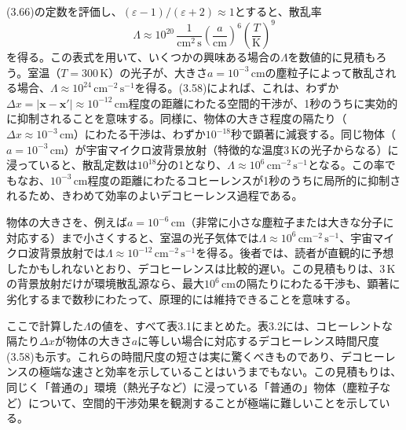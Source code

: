 (3.66)の定数を評価し、$(\varepsilon-1)/(\varepsilon+2)\approx1$とすると、散乱率
\begin{equation}
\Lambda\approx10^{20}\,\frac{1}{\mathrm{cm}^2\,\mathrm s}\left(\frac a{\mathrm{cm}}\right)^6\left(\frac T{\mathrm K}\right)^9
\tag{3.67}
\end{equation}
を得る。この表式を用いて、いくつかの興味ある場合の$\Lambda$を数値的に見積もろう。室温（$T=300\,\mathrm K$）の光子が、大きさ$a=10^{-3}\,\mathrm{cm}$の塵粒子によって散乱される場合、$\Lambda\approx10^{24}\,\mathrm{cm}^{-2}\,\mathrm s^{-1}$を得る。(3.58)によれば、これは、わずか$\Delta x=|\bm x-\bm x'|\approx10^{-12}\,\mathrm{cm}$程度の距離にわたる空間的干渉が、1秒のうちに実効的に抑制されることを意味する。同様に、物体の大きさ程度の隔たり（$\Delta x\approx10^{-3}\,\mathrm{cm}$）にわたる干渉は、わずか$10^{-18}$秒で顕著に減衰する。同じ物体（$a=10^{-3}\,\mathrm{cm}$）が宇宙マイクロ波背景放射（特徴的な温度3\,Kの光子からなる）に浸っていると、散乱定数は$10^{18}$分の1となり、$\Lambda\approx10^6\,\mathrm{cm}^{-2}\,\mathrm s^{-1}$となる。この率でもなお、$10^{-3}\,\mathrm{cm}$程度の距離にわたるコヒーレンスが1秒のうちに局所的に抑制されるため、きわめて効率のよいデコヒーレンス過程である。

物体の大きさを、例えば$a=10^{-6}\,\mathrm{cm}$（非常に小さな塵粒子または大きな分子に対応する）まで小さくすると、室温の光子気体では$\Lambda\approx10^6\,\mathrm{cm}^{-2}\,\mathrm s^{-1}$、宇宙マイクロ波背景放射では$\Lambda\approx10^{-12}\,\mathrm{cm}^{-2}\,\mathrm s^{-1}$を得る。後者では、読者が直観的に予想したかもしれないとおり、デコヒーレンスは比較的遅い。この見積もりは、3\,Kの背景放射だけが環境散乱源なら、最大$10^6\,\mathrm{cm}$の隔たりにわたる干渉も、顕著に劣化するまで数秒にわたって、原理的には維持できることを意味する。

ここで計算した$\Lambda$の値を、すべて表3.1にまとめた。表3.2には、コヒーレントな隔たり$\Delta x$が物体の大きさ$a$に等しい場合に対応するデコヒーレンス時間尺度(3.58)も示す。これらの時間尺度の短さは実に驚くべきものであり、デコヒーレンスの極端な速さと効率を示していることはいうまでもない。この見積もりは、同じく「普通の」環境（熱光子など）に浸っている「普通の」物体（塵粒子など）について、空間的干渉効果を観測することが極端に難しいことを示している。

